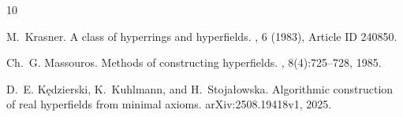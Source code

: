 \documentclass[11pt]{article}
\begin{document}

\begin{thebibliography}{10}

M.~Krasner.
\newblock A class of hyperrings and hyperfields.
, 6
  (1983), Article ID 240850.

Ch.~G. Massouros.
\newblock Methods of constructing hyperfields.
,
  8(4):725--728, 1985.

D.~E. K{\k e}dzierski, K.~Kuhlmann, and H.~Stoja{\l}owska.
\newblock Algorithmic construction of real hyperfields from minimal axioms.
\newblock arXiv:2508.19418v1, 2025.

\end{thebibliography}
\end{document}
